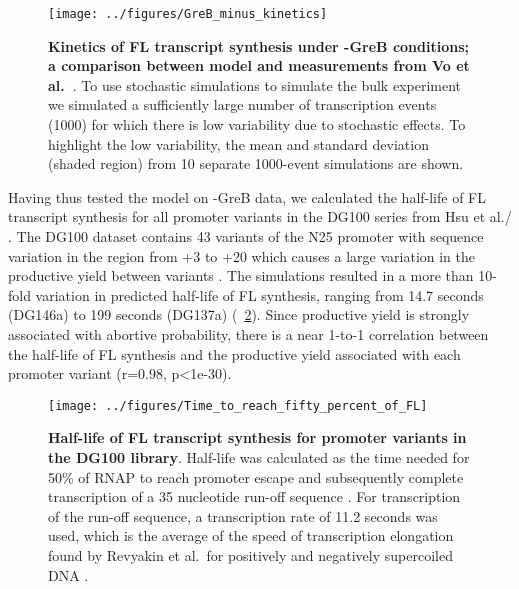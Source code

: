 \begin{figure}[h]
    \begin{center}
        \texttt{[image: ../figures/GreB\_minus\_kinetics]}
    \end{center}
    \caption{ {\bf Kinetics of FL transcript synthesis under -GreB conditions;
        a comparison between model and measurements from Vo
      et al.~\cite{vo_vitro_2003-1}}. To use stochastic simulations to
      simulate the bulk experiment we simulated a sufficiently large number of
      transcription events (1000) for which there is low variability due to
      stochastic effects. To highlight the low variability, the mean and
      standard deviation (shaded region) from 10 separate 1000-event
      simulations are shown.}
  \label{fig:vo_comparison}
\end{figure}

Having thus tested the model on -GreB data, we calculated the half-life of FL
transcript synthesis for all promoter variants in the DG100 series from
Hsu et al./ \cite{hsu_initial_2006}. The DG100 dataset contains 43 variants of
the N25 promoter with sequence variation in the region from +3 to +20 which
causes a large variation in the productive yield between variants
\cite{hsu_initial_2006}. The simulations resulted in a more than 10-fold
variation in predicted half-life of FL synthesis, ranging from 14.7 seconds
(DG146a) to 199 seconds (DG137a) (\FIG~\ref{fig:dg100_halflives}). Since
productive yield is strongly associated with abortive probability, there is a
near 1-to-1 correlation between the half-life of FL synthesis and the
productive yield associated with each promoter variant (r=0.98, p<1e-30).

\begin{figure}[h]
    \begin{center}
        \texttt{[image: ../figures/Time\_to\_reach\_fifty\_percent\_of\_FL]}
    \end{center}
    \caption{ {\bf Half-life of FL transcript synthesis for promoter variants
        in the DG100 library}. Half-life was calculated as the time needed for
        50\% of RNAP to reach promoter escape and subsequently complete
        transcription of a 35 nucleotide run-off sequence
        \cite{vo_vitro_2003-1}. For transcription of the run-off sequence, a
        transcription rate of 11.2 seconds was used, which is the average of
        the speed of transcription elongation found by Revyakin et al.\ for
        positively and negatively supercoiled DNA
        \cite{revyakin_abortive_2006}.}
    \label{fig:dg100_halflives}
\end{figure}

